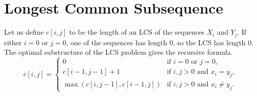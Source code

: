 \documentclass[12pt,twoside,letterpaper]{article}
\begin{document}
\section*{Longest Common Subsequence}
Let us define $c[i,j]$ to be the length of an LCS of the sequences $X_i$ and $Y_j$. If either $i = 0$ or $j = 0$, one of the sequences has length $0$, so the LCS has length $0$. The optimal substructure of the LCS problem gives the recursive formula.
\[ c[i,j] = \left\{ \begin{array}{ll}
0 & \mbox{if $i = 0$ or $j = 0$},\\
c[i-1,j-1]+1 & \mbox{if $i, j > 0$ and $x_i = y_j$},\\
\max{(c[i,j-1], c[i-1,j])} & \mbox{if $i, j > 0$ and $x_i \ne y_j$}.
\end{array} \right. \]
\end{document}
